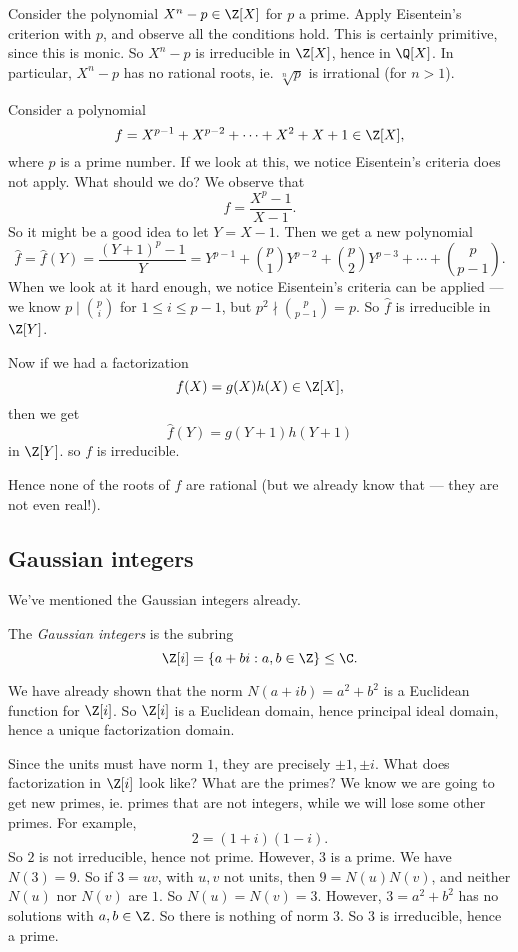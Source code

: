 \documentclass[a4paper]{article}
\begin{document}
\begin{eg}
  Consider the polynomial $X^n - p \in \Z[X]$ for $p$ a prime. Apply Eisentein's criterion with $p$, and observe all the conditions hold. This is certainly primitive, since this is monic. So $X^n - p$ is irreducible in $\Z[X]$, hence in $\Q[X]$. In particular, $X^n - p$ has no rational roots, ie. $\sqrt[n]{p}$ is irrational (for $n > 1$).
\end{eg}

\begin{eg}
  Consider a polynomial
  \[
    f = X^{p - 1} + X^{p - 2} + \cdots + X^2 + X + 1 \in \Z[X],
  \]
  where $p$ is a prime number. If we look at this, we notice Eisentein's criteria does not apply. What should we do? We observe that
  \[
    f = \frac{X^p - 1}{X - 1}.
  \]
  So it might be a good idea to let $Y = X - 1$. Then we get a new polynomial
  \[
    \hat{f} = \hat{f}(Y) = \frac{(Y + 1)^p - 1}{Y} = Y^{p - 1} + \binom{p}{1} Y^{p - 2} + \binom{p}{2} Y^{p - 3} + \cdots + \binom{p}{p - 1}.
  \]
  When we look at it hard enough, we notice Eisentein's criteria can be applied --- we know $p \mid \binom{p}{i}$ for $1 \leq i \leq p - 1$, but $p^2 \nmid \binom{p}{p - 1} = p$. So $\hat{f}$ is irreducible in $\Z[Y]$.

  Now if we had a factorization
  \[
    f(X) = g(X)h(X) \in \Z[X],
  \]
  then we get
  \[
    \hat{f}(Y) = g(Y + 1)h(Y + 1)
  \]
  in $\Z[Y]$. so $f$ is irreducible.

  Hence none of the roots of $f$ are rational (but we already know that --- they are not even real!).
\end{eg}

\subsection{Gaussian integers}
We've mentioned the Gaussian integers already.
\begin{defi}
  The \emph{Gaussian integers} is the subring
  \[
    \Z[i] = \{a + bi: a, b\in \Z\} \leq \C.
  \]
\end{defi}

We have already shown that the norm $N(a + ib) = a^2 + b^2$ is a Euclidean function for $\Z[i]$. So $\Z[i]$ is a Euclidean domain, hence principal ideal domain, hence a unique factorization domain.

Since the units must have norm $1$, they are precisely $\pm 1, \pm i$. What does factorization in $\Z[i]$ look like? What are the primes? We know we are going to get new primes, ie. primes that are not integers, while we will lose some other primes. For example,
\[
  2 = (1 + i)(1 - i).
\]
So $2$ is not irreducible, hence not prime. However, $3$ is a prime. We have $N(3) = 9$. So if $3 = uv$, with $u, v$ not units, then $9 = N(u)N(v)$, and neither $N(u)$ nor $N(v)$ are $1$. So $N(u) = N(v) = 3$. However, $3 = a^2 + b^2$ has no solutions with $a, b \in \Z$. So there is nothing of norm $3$. So $3$ is irreducible, hence a prime.
\end{document}
